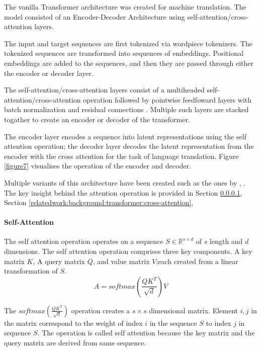 The vanilla Transformer architecture \parencite{vaswani2017attention} was created for machine translation. The model consisted of an Encoder-Decoder Architecture using self-attention/cross-attention layers. 

The input and target sequences are first tokenized via wordpiece tokenizers. The tokenized sequences are transformed into sequences of embeddings. Positional embeddings are added to the sequences, and then they are passed through either the encoder or decoder layer.

The self-attention/cross-attention layers consist of a multiheaded self-attention/cross-attention operation followed by pointwise feedfoward layers with batch normalization \parencite{ioffe2015batch} and residual connections \parencite{he2016deep}. Multiple such layers are stacked togather to create an encoder or decoder of the transformer. 

The encoder layer encodes a sequence into latent representations using the self attention operation; the decoder layer decodes the latent representation from the encoder with the cross attention for the task of language translation. Figure \ref{figure7} visualises the operation of the encoder and decoder. 

Multiple variants of this architecture have been created such as the ones by \cite{radford2019language}, \cite{devlin2018bert}. The key insight behind the attention operation is provided in Section \ref{relatedwork:background:transformer:attention}, Section \ref{relatedwork:background:transformer:cross-attention}, 

\paragraph{Self-Attention}
\label{relatedwork:background:transformer:attention}
The self attention operation operates on a sequence $S \in \mathbb{R}^{s \times d}$ of $s$ length and $d$ dimensions. The self attention operation comprises three key components. A key matrix $K$, A query matrix $Q$, and value matrix $V$;each created from a linear transformation of $S$. 
$$A = softmax(\frac{QK^T}{\sqrt{d}})V$$

The $softmax(\frac{QK^T}{\sqrt{d}})$ operation creates a $s \times s$ dimensional matrix. Element ${i,j}$ in the matrix correspond to the weight of index $i$ in the sequence $S$ to index $j$ in sequence $S$. The operation is called self attention because the key matrix and the query matrix are derived from same sequence.

